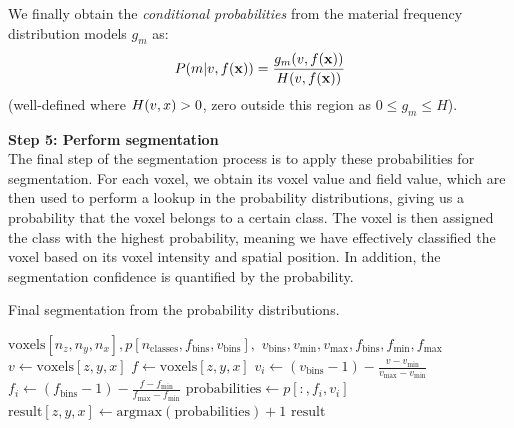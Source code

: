We finally obtain the {\it conditional probabilities} from the material
frequency distribution models $g_m$ as:
\begin{equation}
  \label{eq:Pm}
  P\!\left(m\middle\vert v,f(\mathbf{x})\right) = \frac{g_m(v,f(\mathbf{x}))}{H(v,f(\mathbf{x}))}
\end{equation}
(well-defined where $H(v,x) > 0$, zero outside this region as $0\le g_m \le
H$).


\vspace{\baselineskip}
\noindent\textbf{Step 5: Perform segmentation} \\
The final step of the segmentation process is to apply these probabilities for
segmentation. For each voxel, we obtain its voxel value and field value, which
are then used to perform a lookup in the probability distributions, giving us a
probability that the voxel belongs to a certain class. The voxel is then
assigned the class with the highest probability, meaning we have effectively
classified the voxel based on its voxel intensity and spatial position. In
addition, the segmentation confidence is quantified by the probability.

\begin{algorithm}
    \caption{Final segmentation from the probability distributions.}
    \label{alg:segment}
    \begin{algorithmic}
         {$\text{voxels}[n_z,n_y,n_x], p[n_\text{classes},f_\text{bins},v_\text{bins}],$ \newline \indent \indent $v_\text{bins}, v_\text{min}, v_\text{max}, f_\text{bins}, f_\text{min}, f_\text{max}$}
                \State $v \gets \text{voxels}[z,y,x]$
                    \State $f \gets \text{voxels}[z,y,x]$
                        \State $v_i \gets (v_\text{bins} - 1) - \frac{v - v_\text{min}}{v_\text{max} - v_\text{min}}$
                        \State $f_i \gets (f_\text{bins} - 1) - \frac{f - f_\text{min}}{f_\text{max} - f_\text{min}}$
                        \State $\text{probabilities} \gets p[:,f_i,v_i]$
                        \State $\text{result}[z,y,x] \gets \text{argmax}(\text{probabilities}) + 1$
                    \EndIf
                \EndIf
            \EndFor
            \State \Return $\text{result}$
        \EndFunction
    \end{algorithmic}
\end{algorithm}


